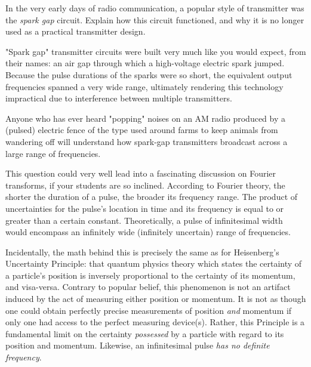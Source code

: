 

In the very early days of radio communication, a popular style of transmitter was the {\it spark gap} circuit.  Explain how this circuit functioned, and why it is no longer used as a practical transmitter design.







"Spark gap" transmitter circuits were built very much like you would expect, from their names: an air gap through which a high-voltage electric spark jumped.  Because the pulse durations of the sparks were so short, the equivalent output frequencies spanned a very wide range, ultimately rendering this technology impractical due to interference between multiple transmitters.







Anyone who has ever heard "popping" noises on an AM radio produced by a (pulsed) electric fence of the type used around farms to keep animals from wandering off will understand how spark-gap transmitters broadcast across a large range of frequencies.

This question could very well lead into a fascinating discussion on Fourier transforms, if your students are so inclined.  According to Fourier theory, the shorter the duration of a pulse, the broader its frequency range.  The product of uncertainties for the pulse's location in time and its frequency is equal to or greater than a certain constant.  Theoretically, a pulse of infinitesimal width would encompass an infinitely wide (infinitely uncertain) range of frequencies.

Incidentally, the math behind this is precisely the same as for Heisenberg's Uncertainty Principle: that quantum physics theory which states the certainty of a particle's position is inversely proportional to the certainty of its momentum, and visa-versa.  Contrary to popular belief, this phenomenon is not an artifact induced by the act of measuring either position or momentum.  It is not as though one could obtain perfectly precise measurements of position {\it and} momentum if only one had access to the perfect measuring device(s).  Rather, this Principle is a fundamental limit on the certainty {\it possessed} by a particle with regard to its position and momentum.  Likewise, an infinitesimal pulse {\it has no definite frequency}.




